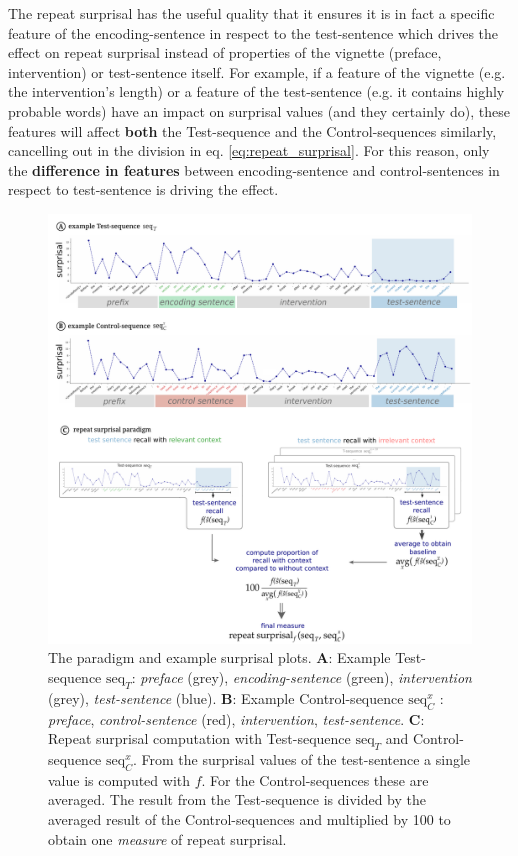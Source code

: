 The repeat surprisal has the useful quality that it ensures it is in fact a specific feature of the encoding-sentence in respect to the test-sentence which drives the effect on repeat surprisal instead of properties of the vignette (preface, intervention) or test-sentence itself.
For example, if a feature of the vignette (e.g. the intervention's length) or a feature of the test-sentence (e.g. it contains highly probable words) have an impact on surprisal values (and they certainly do), these features will affect \textbf{both} the Test-sequence and the Control-sequences similarly, cancelling out in the division in eq. \ref{eq:repeat_surprisal}.
For this reason, only the \textbf{difference in features} between encoding-sentence and control-sentences in respect to test-sentence is driving the effect.

\begin{figure}
    \centering
    \includegraphics[width=\textwidth]{methods/paradigm.pdf}
    \caption{The paradigm and example surprisal plots. \textbf{A}: Example Test-sequence $\text{seq}_T$: \textit{preface} (grey), \textit{encoding-sentence} (green), \textit{intervention} (grey), \textit{test-sentence} (blue). \textbf{B}: Example Control-sequence $\text{seq}_C^x$ : \textit{preface}, \textit{control-sentence} (red), \textit{intervention}, \textit{test-sentence}. \textbf{C}: Repeat surprisal computation with Test-sequence $\text{seq}_T$ and Control-sequence $\text{seq}_C^x$. From the surprisal values of the test-sentence a single value is computed with $f$. For the Control-sequences these are averaged. The result from the Test-sequence is divided by the averaged result of the Control-sequences and multiplied by 100 to obtain one \textit{measure} of repeat surprisal.}
\end{figure}


